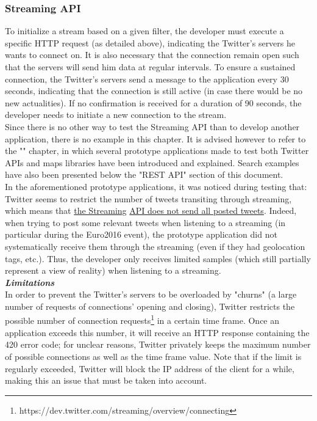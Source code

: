 \documentclass[a4paper,11pt]{report}
\begin{document}
\subsubsection{Streaming API}
To initialize a stream based on a given filter, the developer must execute a specific HTTP request (as detailed above), indicating the Twitter's servers he wants to connect on. It is also necessary that the connection remain open such that the servers will send him data at regular intervals. To ensure a sustained connection, the Twitter's servers send a message to the application every 30 seconds, indicating that the connection is still active (in case there would be no new actualities). If no confirmation is received for a duration of 90 seconds, the developer needs to initiate a new connection to the stream.\\

Since there is no other way to test the Streaming API than to develop another application, there is no example in this chapter. It is advised however to refer to the "" chapter, in which several prototype applications made to test both Twitter APIs and maps libraries have been introduced and explained. Search examples have also been presented below the "REST API" section of this document.\\

In the aforementioned prototype applications, it was noticed during testing that: Twitter seems to restrict the number of tweets transiting through streaming, which means that \underline{the Streaming} \underline{API does not send all posted tweets}. Indeed, when trying to post some relevant tweets when listening to a streaming (in particular during the Euro2016 event), the prototype application did not systematically receive them through the streaming (even if they had geolocation tags, etc.). Thus, the developer only receives limited samples (which still partially represent a view of reality) when listening to a streaming.\\

\textbf{\emph{Limitations}}\\
In order to prevent the Twitter's servers to be overloaded by "churns" (a large number of requests of connections' opening and closing), Twitter restricts the possible number of connection requests\footnote{https://dev.twitter.com/streaming/overview/connecting} in a certain time frame. Once an application exceeds this number, it will receive an HTTP response containing the 420 error code; for unclear reasons, Twitter privately keeps the maximum number of possible connections as well as the time frame value. Note that if the limit is regularly exceeded, Twitter will block the IP address of the client for a while, making this an issue that must be taken into account.\\
\end{document}
